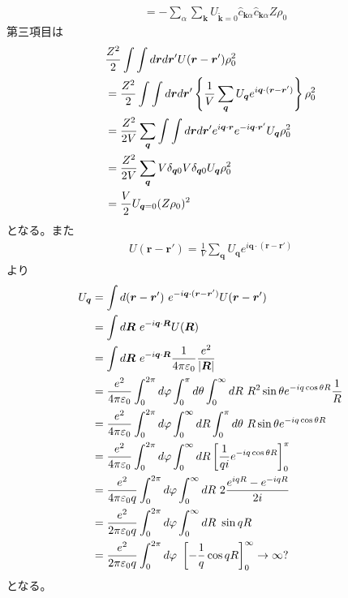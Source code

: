 \documentclass[dvipdfmx, 11pt, a4paper]{jsarticle}
\theoremstyle{definition}
\numberwithin{equation}{section}
\begin{document}
\begin{derivationBox}
\begin{align}
            &= -\sum_\alpha \sum_{\bm{k}}    U_{\bm{\tilde{k}}=0} \hat{c}_{\bm{k}\alpha} \hat{c}_{\bm{k}\alpha}Z\rho_0 
        \end{align}
        第三項目は
        \begin{align}
            &\frac{Z^2}{2} \int \int d\bm{r} d\bm{r}' U(\bm{r}-\bm{r}')\rho_0^2 \notag \\
            &=\frac{Z^2}{2} \int \int d\bm{r} d\bm{r}' \left\{ \frac{1}{V}\sum_{\bm{q}}U_{\bm{q}}e^{i\bm{q}\cdot (\bm{r}-\bm{r}')} \right\}\rho_0^2 \notag \\
            &=\frac{Z^2}{2V}\sum_{\bm{q}} \int \int d\bm{r} d\bm{r}' e^{i\bm{q}\cdot \bm{r}} e^{-i\bm{q}\cdot \bm{r}'}U_{\bm{q}} \rho_0^2 \notag \\
            &=\frac{Z^2}{2V}\sum_{\bm{q}}  V\delta_{\bm{q}0} V\delta_{\bm{q}0}U_{\bm{q}} \rho_0^2 \notag \\
            &=\frac{V}{2}U_{\bm{q}=0} (Z\rho_0)^2
        \end{align}
        となる。また
        \begin{align}
            U(\bm{r}-\bm{r}') = \frac{1}{V}\sum_{\bm{q}}U_{\bm{q}}e^{i\bm{q}\cdot (\bm{r}-\bm{r}')}
        \end{align}
        より
        \begin{align}
            U_{\bm{q}} &= \int d(\bm{r}-\bm{r}')\  e^{-i\bm{q}\cdot (\bm{r}-\bm{r}')} U(\bm{r}-\bm{r}') \notag \\
            &= \int d\bm{R}\ e^{-i\bm{q}\cdot \bm{R}} U(\bm{R}) \notag \\
            &= \int d\bm{R}\ e^{-i\bm{q}\cdot \bm{R}} \frac{1}{4\pi\varepsilon_0} \frac{e^2}{|\bm{R}|} \notag \\
            &= \frac{e^2}{4\pi\varepsilon_0}\int_0^{2\pi} d\varphi \int_{0}^{\pi}d\theta\int_0^{\infty} dR\ R^2 \sin \theta  e^{-iq\cos \theta R} \frac{1}{R} \notag \\
            &= \frac{e^2}{4\pi\varepsilon_0}\int_0^{2\pi} d\varphi \int_0^{\infty} dR\int_{0}^{\pi}d\theta\ R \sin \theta  e^{-iq\cos \theta R} \notag \\
            &= \frac{e^2}{4\pi\varepsilon_0}\int_0^{2\pi} d\varphi \int_0^{\infty} dR\left[  \frac{1}{qi} e^{-iq\cos \theta R} \right]_0^\pi\notag \\
            &= \frac{e^2}{4\pi\varepsilon_0q}\int_0^{2\pi} d\varphi \int_0^{\infty} dR\ 2 \frac{e^{iq R} - e^{-iq R} }{2i}\notag \\
            &= \frac{e^2}{2\pi\varepsilon_0q}\int_0^{2\pi} d\varphi \int_0^{\infty} dR\ \sin qR\notag \\
            &= \frac{e^2}{2\pi\varepsilon_0q}\int_0^{2\pi} d\varphi\ \left[ -\frac{1}{q}\cos qR\right]_0^\infty \rightarrow \infty?
        \end{align}
        となる。
    \end{derivationBox}
\end{document}
